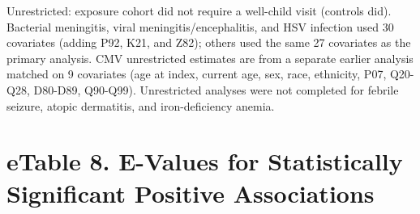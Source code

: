 \documentclass[11pt]{article}
\begin{document}
\begin{landscape}
Unrestricted: exposure cohort did not require a well-child
visit (controls did). Bacterial meningitis, viral
meningitis/encephalitis, and HSV infection used 30
covariates (adding P92, K21, and Z82); others used the same
27 covariates as the primary analysis. CMV unrestricted
estimates are from a separate earlier analysis matched on 9
covariates (age at index, current age, sex, race, ethnicity,
P07, Q20-Q28, D80-D89, Q90-Q99). Unrestricted analyses were
not completed for febrile seizure, atopic dermatitis, and
iron-deficiency anemia.

\newpage

\hypertarget{etable-8.-e-values-for-statistically-significant-positive-associations}{%
\section*{eTable 8. E-Values for Statistically Significant
Positive
Associations}\label{etable-8.-e-values-for-statistically-significant-positive-associations}}


\end{landscape}
\end{document}

